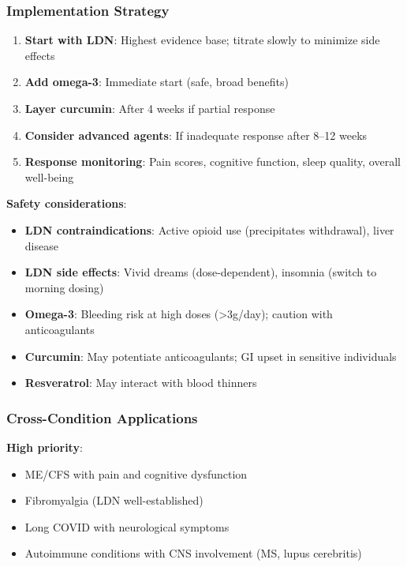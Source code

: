 \subsubsection{Implementation Strategy}

\begin{enumerate}
    \item \textbf{Start with LDN}: Highest evidence base; titrate slowly to minimize side effects
    \item \textbf{Add omega-3}: Immediate start (safe, broad benefits)
    \item \textbf{Layer curcumin}: After 4 weeks if partial response
    \item \textbf{Consider advanced agents}: If inadequate response after 8--12 weeks
    \item \textbf{Response monitoring}: Pain scores, cognitive function, sleep quality, overall well-being
\end{enumerate}

\textbf{Safety considerations}:
\begin{itemize}
    \item \textbf{LDN contraindications}: Active opioid use (precipitates withdrawal), liver disease
    \item \textbf{LDN side effects}: Vivid dreams (dose-dependent), insomnia (switch to morning dosing)
    \item \textbf{Omega-3}: Bleeding risk at high doses (>3g/day); caution with anticoagulants
    \item \textbf{Curcumin}: May potentiate anticoagulants; GI upset in sensitive individuals
    \item \textbf{Resveratrol}: May interact with blood thinners
\end{itemize}

\subsubsection{Cross-Condition Applications}

\textbf{High priority}:
\begin{itemize}
    \item ME/CFS with pain and cognitive dysfunction
    \item Fibromyalgia (LDN well-established)
    \item Long COVID with neurological symptoms
    \item Autoimmune conditions with CNS involvement (MS, lupus cerebritis)
\end{itemize}

